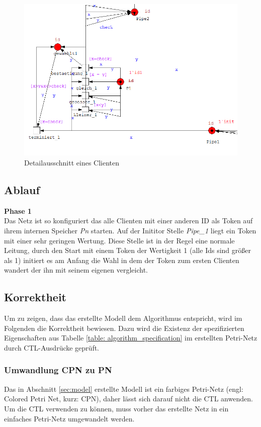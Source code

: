 \begin{figure}[H]
\centering
\includegraphics[width=1\linewidth]{kapitel/hauptteil/img/cpn_detail}
\caption{Detailausschnitt eines Clienten}
\label{fig:cpn_detail}
\end{figure}

\subsection{Ablauf}
\textbf{Phase 1}\\
Das Netz ist so konfiguriert das alle Clienten mit einer anderen ID als Token auf ihrem internen Speicher \textit{Pn} starten. Auf der Inititor Stelle \textit{Pipe\_1} liegt ein Token mit einer sehr geringen Wertung. Diese Stelle ist in der Regel eine normale Leitung, durch den Start mit einem Token der Wertigkeit 1 (alle Ids sind größer als 1) initiert es am Anfang die Wahl in dem der Token zum ersten Clienten wandert der ihn mit seinem eigenen vergleicht.	

\subsection{Korrektheit}
Um zu zeigen, dass das erstellte Modell dem Algorithmus entspricht, wird im Folgenden die Korrektheit bewiesen. Dazu wird die Existenz der spezifizierten Eigenschaften aus Tabelle \ref{table: algorithm_specification} im erstellten Petri-Netz durch CTL-Ausdrücke geprüft.

\subsubsection{Umwandlung CPN zu PN}
Das in Abschnitt \ref{sec:model} erstellte Modell ist ein farbiges Petri-Netz (engl: Colored Petri Net, kurz: CPN), daher lässt sich darauf nicht die CTL anwenden. Um die CTL verwenden zu können, muss vorher das erstellte Netz in ein einfaches Petri-Netz umgewandelt werden.

